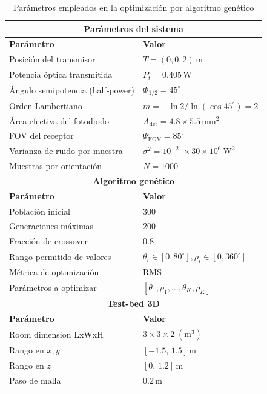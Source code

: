 \documentclass[lettersize,journal]{IEEEtran}
\begin{document}
\begin{table}[ht]
\centering
\caption{Parámetros empleados en la optimización por algoritmo genético}
\label{tab:ga_params}
\begin{tabular}{|l|l|}
\hline
\multicolumn{2}{|c|}{\textbf{Parámetros del sistema}} \\ \hline
\textbf{Parámetro} & \textbf{Valor} \\ \hline
Posición del transmisor           & $T=(0,0,2)\,$m \\ \hline
Potencia óptica transmitida       & $P_t=0.405\,$W \\ \hline
Ángulo semipotencia (half‐power)  & $\Phi_{1/2}=45^\circ$ \\ \hline
Orden Lambertiano                 & $m=-\ln2/\ln(\cos45^\circ)=2$ \\ \hline
Área efectiva del fotodiodo       & $A_{\mathrm{det}}=4.8\times5.5\,\mathrm{mm}^2$ \\ \hline
FOV del receptor                   & $\Psi_{\mathrm{FOV}}=85^\circ$ \\ \hline
Varianza de ruido por muestra     & $\sigma^2=10^{-21}\times30\times10^6\ \mathrm{W}^2$ \\ \hline
Muestras por orientación          & $N=1000$ \\ \hline
\multicolumn{2}{|c|}{\textbf{Algoritmo genético}} \\ \hline
\textbf{Parámetro} & \textbf{Valor} \\ \hline
Población inicial                 & 300 \\ \hline
Generaciones máximas              & 200 \\ \hline
Fracción de crossover             & 0.8 \\ \hline
Rango permitido de valores        & $\theta_{i} \in [0,80^\circ], \rho_{i} \in [0,360^\circ]$ \\ \hline
Métrica de optimización           & RMS \\ \hline
Parámetros a optimizar            & $[\theta_{1},\rho_{1},\dots,\theta_{K},\rho_{K}]$ \\ \hline
\multicolumn{2}{|c|}{\textbf{Test‐bed 3D}} \\ \hline
\textbf{Parámetro} & \textbf{Valor} \\ \hline
Room dimension LxWxH              & $3\times 3 \times 2\; (\mathrm{m^3})$ \\ \hline
Rango en $x,y$                    & $[-1.5,\,1.5]\,$m \\ \hline
Rango en $z$                      & $[0,\,1.2]\,$m \\ \hline
Paso de malla                     & $0.2\,$m \\ \hline
\end{tabular}
\end{table}
\end{document}
